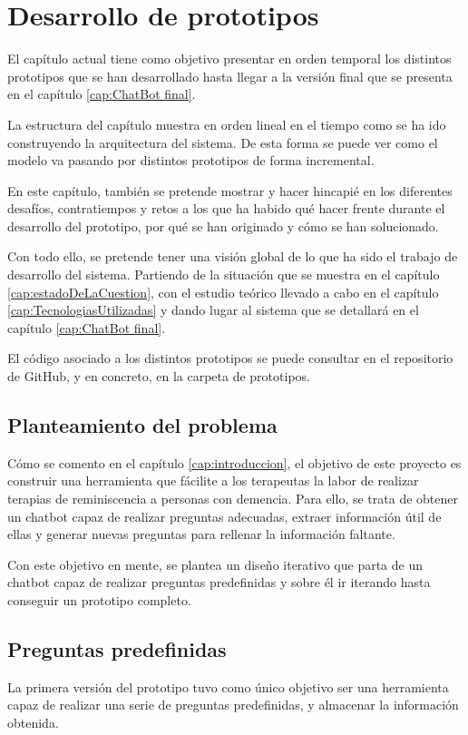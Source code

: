 \chapter{Desarrollo de prototipos}
\label{cap:Desarrollo de prototipos}

El capítulo actual tiene como objetivo presentar en orden temporal los distintos prototipos que se han desarrollado hasta llegar a la versión final que se presenta en el capítulo \ref{cap:ChatBot final}. 

La estructura del capítulo  muestra en orden lineal en el tiempo como se ha ido construyendo la arquitectura del sistema. De esta forma se puede ver como el modelo va pasando por distintos prototipos de forma incremental. 

En este capítulo, también se pretende mostrar y hacer hincapié en los diferentes desafíos, contratiempos y retos a los que ha habido qué hacer frente durante el desarrollo del prototipo, por qué se han originado y cómo se han solucionado. 

Con todo ello, se pretende tener una visión global de lo que ha sido el trabajo de desarrollo del sistema. Partiendo de la situación que se muestra en el capítulo \ref{cap:estadoDeLaCuestion}, con el estudio teórico llevado a cabo en el capítulo \ref{cap:TecnologiasUtilizadas} y dando lugar al sistema que se detallará en el capítulo \ref{cap:ChatBot final}. 

El código asociado a los distintos prototipos se puede consultar en el repositorio de GitHub, y en concreto, en la carpeta de prototipos. 

\section{Planteamiento del problema}
Cómo se comento en el capítulo \ref{cap:introduccion}, el objetivo de este proyecto es construir una herramienta que fácilite a los terapeutas la labor de realizar terapias de reminiscencia a personas con demencia. Para ello, se trata de obtener un chatbot capaz de realizar preguntas adecuadas, extraer información útil de ellas y generar nuevas preguntas para rellenar la información faltante. 

Con este objetivo en mente, se plantea un diseño iterativo que parta de un chatbot capaz de realizar preguntas predefinidas y sobre él ir iterando hasta conseguir un prototipo completo.

\section{Preguntas predefinidas}
\label{ssubsec:seleccionpreguntas}
La primera versión del prototipo tuvo como único objetivo ser una herramienta capaz de realizar una serie de preguntas predefinidas, y almacenar la información obtenida.

